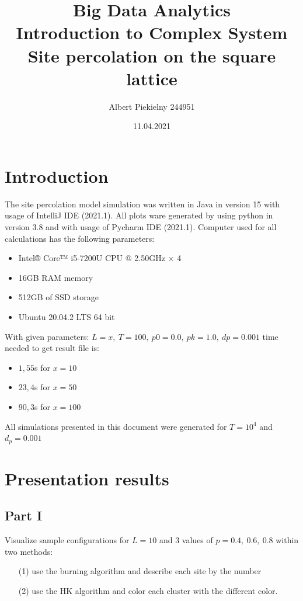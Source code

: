 \documentclass[11pt]{article}
\title{Big Data Analytics\\ Introduction to Complex System\\ Site percolation on the square lattice}
\author{Albert Piekielny 244951\\}
\date{11.04.2021}
\begin{document}
    \maketitle


    \section{Introduction}
    \label{sec:introduction}

    The site percolation model simulation was written in Java in version 15 with usage of IntelliJ IDE (2021.1).
    All plots ware generated by using python in version 3.8 and with usage of Pycharm IDE (2021.1).
    Computer used for all calculations has the following parameters:
    \begin{itemize}
        \item Intel® Core™ i5-7200U CPU @ 2.50GHz × 4
        \item 16GB RAM memory
        \item 512GB of SSD storage
        \item Ubuntu 20.04.2 LTS 64 bit
    \end{itemize}
    With given parameters: $L=x,\ T=100,\ p0=0.0,\ pk=1.0,\ dp=0.001$ time needed to get result file is:
    \begin{itemize}
        \item $1,55$s for $x = 10$
        \item $23,4$s for $x = 50$
        \item $90,3$s for $x = 100$
    \end{itemize}

    All simulations presented in this document were generated for $T=10^4$ and $d_p = 0.001$


    \section{Presentation results}
    \label{sec:results}

    \subsection{Part I}
    \label{subsec:part-1}

    Visualize sample configurations for $L = 10$ and $3$ values of $p = 0.4,\ 0.6,\ 0.8$ within two methods:
    \begin{itemize}
        \item[(1)] use the burning algorithm and describe each site by the number
        \item[(2)] use the HK algorithm and color each cluster with the different color.
    \end{itemize}
\end{document}
